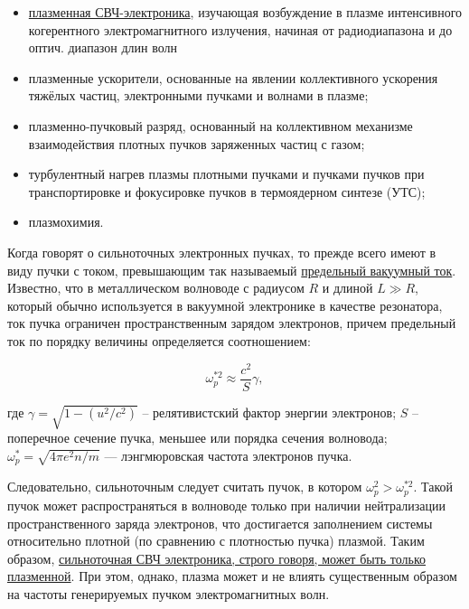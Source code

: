 \documentclass[10pt, a4paper]{article}
\begin{document}
\begin{itemize}
	
	\item \uline{плазменная СВЧ-электроника}, изучающая возбуждение в плазме интенсивного когерентного электромагнитного излучения, начиная от радиодиапазона и до оптич. диапазон длин волн
	
	\item плазменные ускорители, основанные на явлении коллективного ускорения тяжёлых частиц, электронными пучками и волнами в плазме;
	
	\item плазменно-пучковый разряд, основанный на коллективном механизме взаимодействия плотных пучков заряженных частиц с газом;
	
	\item турбулентный нагрев плазмы плотными пучками и пучками пучков при транспортировке и фокусировке пучков в термоядерном синтезе (УТС);
	
	\item плазмохимия.
	
\end{itemize}
   
Когда говорят о сильноточных электронных пучках, то прежде всего имеют в виду пучки с током, превышающим так называемый \uline{предельный вакуумный ток}. Известно, что в металлическом волноводе с радиусом $R$ и длиной $L\gg R$, который обычно используется в вакуумной электронике в качестве резонатора, ток пучка ограничен пространственным зарядом электронов, причем предельный ток по порядку величины определяется соотношением:

\begin{equation}
	\omega_p^{*2} \approx \frac{c^2}{S}\gamma,
\end{equation}

где $\gamma = \sqrt{1-(u^2/c^{2})}$ -- релятивистский фактор энергии электронов; $S$ -- поперечное сечение пучка, меньшее или порядка сечения волновода; $\omega_p^{*} = \sqrt{4\pi e^2n/m}$ — лэнгмюровская частота электронов пучка. 

Следовательно, сильноточным следует считать пучок, в котором $\omega_p^2>\omega_p^{*2}$. Такой пучок может распространяться в волноводе только при наличии нейтрализации пространственного заряда электронов, что достигается заполнением системы относительно плотной (по сравнению с плотностью пучка) плазмой. Таким образом, \uline{сильноточная СВЧ электроника, строго говоря, может быть только плазменной}. При этом, однако, плазма может и не влиять существенным образом на частоты генерируемых пучком электромагнитных волн.
\end{document}
